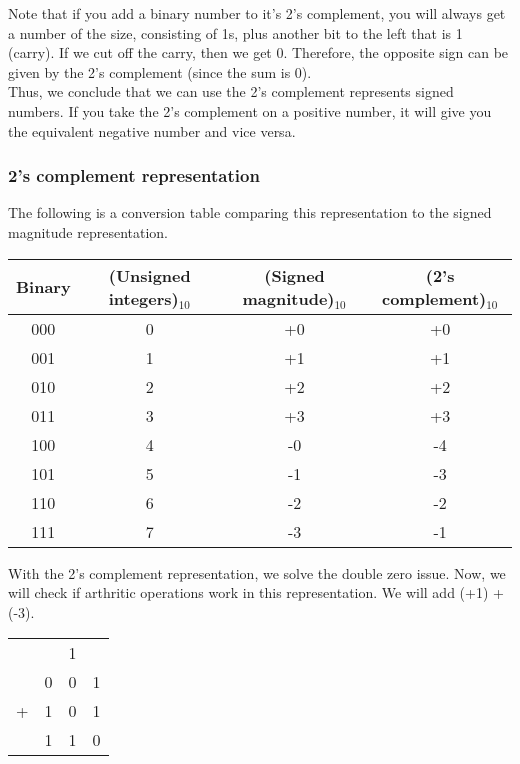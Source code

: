 \documentclass[]{article}
\begin{document}
Note that if you add a binary number to it's 2's complement, you will always get a number of the size, consisting of 1s, plus another bit to the left that is 1 (carry). If we cut off the carry, then we get 0. Therefore, the opposite sign can be given by the 2's complement (since the sum is 0).\\

Thus, we conclude that we can use the 2's complement represents signed numbers. If you take the 2's complement on a positive number, it will give you the equivalent negative number and vice versa.\\


\subsubsection{2's complement representation}
\bigbreak

The following is a conversion table comparing this representation to the signed magnitude representation.

\begin{center}
	\begin{table}[h]\centering
		\begin{tabular}{|c|c|c|c|}
			\hline
			Binary & (Unsigned integers)$_{10}$ & (Signed magnitude)$_{10}$ & (2's complement)$_{10}$ \\ \hline
			000 & 0 & +0 & +0\\
			001 & 1 & +1 & +1\\
			010 & 2 & +2 & +2\\
			011 & 3 & +3 & +3\\
			100 & 4 & -0 & -4\\
			101 & 5 & -1 & -3\\
			110 & 6 & -2 & -2\\
			111 & 7 & -3 & -1\\ \hline
		\end{tabular}
	\end{table}
\end{center}

With the 2's complement representation, we solve the double zero issue. Now, we will check if arthritic operations work in this representation. We will add (+1) + (-3). 

\begin{center}
	\begin{tabular}{cccc}
		\tiny & \tiny  & \tiny 1 &  \\
		& 0 & 0 & 1 \\
		+ & 1  & 0 & 1 \\
		\hline
		& 1 & 1 & 0 \\
	\end{tabular}
	\bigbreak
\end{center}
\end{document}
